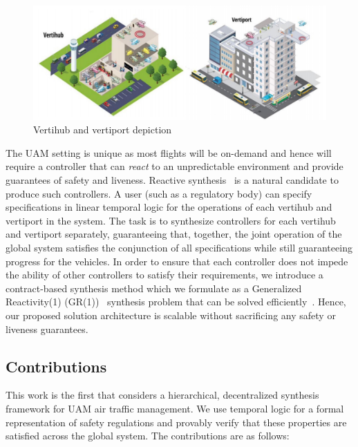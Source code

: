 \begin{figure}
	\centering
	\includegraphics[width=0.98\columnwidth]{UAM-NFM/Figures/vert.PNG}
	\caption{Vertihub and vertiport depiction}
	\label{fig:uam_architecture}
\end{figure}


The UAM setting is unique as most flights will be on-demand and hence will require a controller that can \emph{react} to an unpredictable environment and provide guarantees of safety and liveness. Reactive synthesis~\cite{bloem2018graph} is a natural candidate to produce such controllers. A user (such as a regulatory body) can specify specifications in linear temporal logic for the operations of each vertihub and vertiport in the system. The task is to synthesize controllers for each vertihub and vertiport separately, guaranteeing that, together, the joint operation of the global system satisfies the conjunction of all specifications while still guaranteeing progress for the vehicles. In order to ensure that each controller does not impede the ability of other controllers to satisfy their requirements, we introduce a contract-based synthesis method which we formulate as a Generalized Reactivity(1) (GR(1))~\cite{bloem2012} synthesis problem that can be solved efficiently~\cite{wolff2013efficient,alur2016compositional}. Hence, our proposed solution architecture is scalable without sacrificing any safety or liveness guarantees. 


\subsection{Contributions}
This work is the first that considers a hierarchical, decentralized synthesis framework for UAM air traffic management. We use temporal logic for a formal representation of safety regulations and provably verify that these properties are satisfied across the global system. The contributions are as follows:

